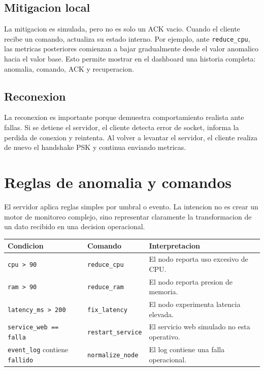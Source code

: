 \documentclass[11pt,letterpaper]{article}
\begin{document}
\subsection{Mitigacion local}

La mitigacion es simulada, pero no es solo un ACK vacio. Cuando el cliente recibe
un comando, actualiza su estado interno. Por ejemplo, ante \texttt{reduce\_cpu},
las metricas posteriores comienzan a bajar gradualmente desde el valor anomalico
hacia el valor base. Esto permite mostrar en el dashboard una historia completa:
anomalia, comando, ACK y recuperacion.

\subsection{Reconexion}

La reconexion es importante porque demuestra comportamiento realista ante fallas.
Si se detiene el servidor, el cliente detecta error de socket, informa la perdida
de conexion y reintenta. Al volver a levantar el servidor, el cliente realiza de
nuevo el handshake PSK y continua enviando metricas.

\newpage
\section{Reglas de anomalia y comandos}

El servidor aplica reglas simples por umbral o evento. La intencion no es crear
un motor de monitoreo complejo, sino representar claramente la transformacion de
un dato recibido en una decision operacional.

\begin{longtable}{|p{}|p{}|p{}|}
\hline
\textbf{Condicion} & \textbf{Comando} & \textbf{Interpretacion} \\
\hline
\texttt{cpu > 90} & \texttt{reduce\_cpu} & El nodo reporta uso excesivo de CPU. \\
\hline
\texttt{ram > 90} & \texttt{reduce\_ram} & El nodo reporta presion de memoria. \\
\hline
\texttt{latency\_ms > 200} & \texttt{fix\_latency} & El nodo experimenta latencia elevada. \\
\hline
\texttt{service\_web == falla} & \texttt{restart\_service} & El servicio web simulado no esta operativo. \\
\hline
\texttt{event\_log} contiene \texttt{fallido} & \texttt{normalize\_node} & El log contiene una falla operacional. \\
\hline
\end{longtable}
\end{document}
